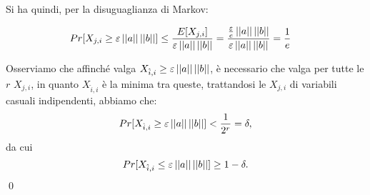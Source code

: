 \begin{proof*}
Si ha quindi, per la disuguaglianza di Markov:

\begin{align*}
    Pr[X_{j, i} \ge \varepsilon \left|\left|a\right|\right|\left|\left|b\right|\right|] &\le
        \frac{E[X_{j, i}]}{\varepsilon \left|\left|a\right|\right|\left|\left|b\right|\right|}
        = \frac{\frac{\varepsilon}{e} \left|\left|a\right|\right|\left|\left|b\right|\right|}
            {\varepsilon \left|\left|a\right|\right|\left|\left|b\right|\right|} 
        = \frac{1}{e}
\end{align*}

Osserviamo che affinché valga $X_{\hat{i}, i} \ge \varepsilon \left|\left|a\right|\right|\left|\left|b\right|\right|$,
è necessario che valga per tutte le $r$ $X_{j, i}$, in quanto $X_{\hat{i}, i}$
è la minima tra queste, trattandosi le $X_{j, i}$ di variabili casuali
indipendenti, abbiamo che:
\[ Pr[X_{\hat{i}, i} \ge \varepsilon \left|\left|a\right|\right|\left|\left|b\right|\right|] < \frac{1}{2^r} = \delta, \]
da cui
\[ Pr[X_{\hat{i}, i} \le \varepsilon \left|\left|a\right|\right|\left|\left|b\right|\right|] \ge 1 - \delta. \]
\qed
\end{proof*}